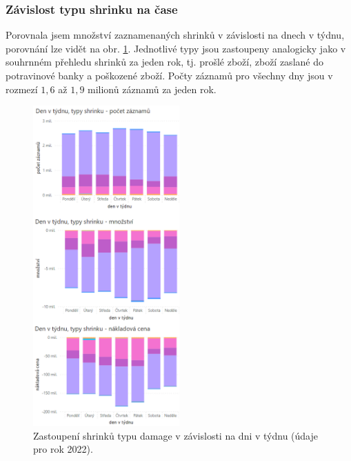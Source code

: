 \subsubsection*{Závislost typu shrinku na čase}

Porovnala jsem množství zaznamenaných shrinků v závislosti na dnech v týdnu, porovnání lze vidět na obr. \ref*{obr:rok:g:tydenD}. Jednotlivé typy jsou zastoupeny analogicky jako v souhrnném přehledu shrinků za jeden rok, tj. prošlé zboží, zboží zaslané do potravinové banky a poškozené zboží. Počty záznamů pro všechny dny jsou v rozmezí $1{,}6$ až $1{,}9$ milionů záznamů  za jeden rok. %

\begin{figure}[hbtp!]
    \centering
    \includegraphics[width=0.5\textwidth]{obrazky/grafy/Grad_dny_tyden-D.png}
    \caption{Zastoupení shrinků typu damage v závislosti na dni v týdnu (údaje pro rok 2022).}
    \label{obr:rok:g:tydenD}
\end{figure}


